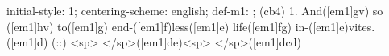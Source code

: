 initial-style: 1;
centering-scheme: english;
def-m1: \grealign;
(cb4) 1. And([em1]gv) so ([em1]hv) to([em1]g) end-([em1]f)less([em1]e) life([em1]fg) in-([em1]e)vites.([em1]d) (::) <sp> </sp>([em1]de)<sp> </sp>([em1]dcd)